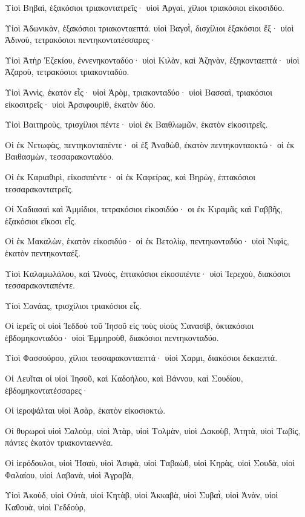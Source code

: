 {\par }{\PP {}Υἱοὶ Βηβαὶ, ἑξακόσιοι τριακοντατρεῖς· υἱοὶ Ἀργαὶ, χίλιοι τριακόσιοι εἰκοσιδύο.
\par }{\PP {}Υἱοὶ Ἀδωνικὰν, ἑξακόσιοι τριακονταεπτά. υἱοὶ Βαγοῒ, δισχίλιοι ἑξακόσιοι ἕξ· υἱοὶ Ἀδινοὺ, τετρακόσιοι πεντηκοντατέσσαρες·
\par }{\PP {}Υἱοὶ Ἀτὴρ Ἐζεκίου, ἐννενηκονταδύο· υἱοὶ Κιλὰν, καὶ Ἀζηνὰν, ἑξηκονταεπτά· υἱοὶ Ἀζαροὺ, τετρακόσιοι τριακονταδύο.
\par }{\PP {}Υἱοὶ Ἁννὶς, ἑκατὸν εἷς· υἱοὶ Ἀρὸμ, τριακονταδύο· υἱοὶ Βασσαὶ, τριακόσιοι εἰκοσιτρεῖς· υἱοὶ Ἀρσιφουρὶθ, ἑκατὸν δύο.
\par }{\PP {}Υἱοὶ Βαιτηροὺς, τρισχίλιοι πέντε· υἱοὶ ἐκ Βαιθλωμῶν, ἑκατὸν εἰκοσιτρεῖς.
\par }{\PP {}Οἱ ἐκ Νετωφὰς, πεντηκονταπέντε· οἱ ἐξ Ἀναθὼθ, ἑκατὸν πεντηκονταοκτώ· οἱ ἐκ Βαιθασμὼν, τεσσαρακονταδύο.
\par }{\PP {}Οἱ ἐκ Καριαθιρὶ, εἰκοσιπέντε· οἱ ἐκ Καφείρας, καὶ Βηρὼγ, ἑπτακόσιοι τεσσαρακοντατρεῖς.
\par }{\PP {}Οἱ Χαδιασαὶ καὶ Ἁμμίδιοι, τετρακόσιοι εἰκοσιδύο· οι ἐκ Κιραμᾶς καὶ Γαββῆς, ἑξακόσιοι εἴκοσι εἷς.
\par }{\PP {}Οἱ ἐκ Μακαλὼν, ἑκατὸν εἰκοσιδύο· οἱ ἐκ Βετολίῳ, πεντηκονταδύο· υἱοὶ Νιφὶς, ἑκατὸν πεντηκονταέξ.
\par }{\PP {}Υἱοὶ Καλαμωλάλου, καὶ Ὠνοὺς, ἑπτακόσιοι εἰκοσιπέντε· υἱοὶ Ἱερεχοὺ, διακόσιοι τεσσαρακονταπέντε.
\par }{\PP {}Υἱοὶ Σανάας, τρισχίλιοι τριακόσιοι εἷς.
\par }{\PP {}Οἱ ἱερεῖς οἱ υἱοὶ Ἰεδδοὺ τοῦ Ἰησοῦ εἰς τοὺς υἱοὺς Σανασὶβ, ὀκτακόσιοι ἑβδομηκονταδύο· υἱοὶ Ἐμμηροὺθ, διακόσιοι πεντηκονταδύο.
\par }{\PP {}Υἱοὶ Φασσούρου, χίλιοι τεσσαρακονταεπτά· υἱοὶ Χαρμι, διακόσιοι δεκαεπτά.
\par }{\PP {}Οἱ Λευῖται οἱ υἱοὶ Ἰησοῦ, καὶ Καδοήλου, καὶ Βάννου, καὶ Σουδίου, ἑβδομηκοντατέσσαρες·
\par }{\PP {}Οἱ ἱεροψάλται υἱοὶ Ἀσὰρ, ἑκατὸν εἰκοσιοκτώ.
\par }{\PP {}Οἱ θυρωροὶ υἱοὶ Σαλοὺμ, υἱοὶ Ἀτὰρ, υἱοὶ Τολμὰν, υἱοὶ Δακοὺβ, Ἀτητὰ, υἱοὶ Τωβὶς, πάντες ἑκατὸν τριακονταεννέα.
\par }{\PP {}Οἱ ἱερόδουλοι, υἱοὶ Ἡσαὺ, υἱοὶ Ἀσιφὰ, υἱοὶ Ταβαὼθ, υἱοὶ Κηρὰς, υἱοὶ Σουδὰ, υἱοὶ Φαλαίου, υἱοὶ Λαβανὰ, υἱοὶ Ἀγραβὰ,
\par }{\PP {}Υἱοὶ Ἀκοὺδ, υἱοὶ Οὐτὰ, υἱοὶ Κητὰβ, υἱοὶ Ἀκκαβὰ, υἱοὶ Συβαῒ, υἱοὶ Ἀνὰν, υἱοὶ Καθουὰ, υἱοὶ Γεδδοὺρ,
}
